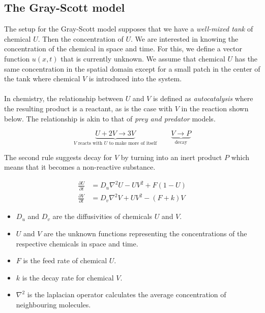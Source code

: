 \documentclass[a4paper, 11pt]{article}
\begin{document}
\subsection{The Gray-Scott model}
\label{sec:gray-scott}

The setup for the Gray-Scott model supposes that we have a \emph{well-mixed tank} of chemical $U$. Then the concentration of $U$. We are interested in knowing the concentration of the chemical in space and time. For this, we define a vector function $u(x, t)$  that is currently unknown. We assume that chemical $U$ has the same concentration in the spatial domain except for a small patch in the center of the tank where chemical $V$ is introduced into the system. \\
\\
In chemistry, the relationship between $U$ and $V$ is defined as \textit{autocatalysis} where the resulting product is a reactant, as is the case with $V$ in the reaction shown below. The relationship is akin to that of \textit{prey and predator} models.

\begin{equation*}
	\underbrace{U + 2V \to 3V}_{\text{$V$ reacts with $U$ to make more of itself}}
	\qquad
	\underbrace{V \to P}_{\text{decay}}
\end{equation*}


The second rule suggests decay for $V$ by turning into an inert product $P$ which means that it becomes a non-reactive substance.


\begin{align*}
	\frac{\partial U}{\partial t} & = D_u \nabla^2 U - UV^2 + F(1 - U) \\
	\frac{\partial V}{\partial t} & = D_v \nabla^2 V + UV^2 - (F + k)V
\end{align*}
\begin{itemize}
	\item $D_u$ and $D_v$ are the diffusivities of chemicals $U$ and $V$.
	\item $U$ and $V$ are the unknown functions representing the concentrations of the respective chemicals in space and time.
	\item $F$ is the feed rate of chemical $U$.
	\item $k$ is the decay rate for chemical $V$.
    \item $\nabla^2$ is the laplacian operator calculates the average concentration of neighbouring molecules. 
\end{itemize}
\end{document}
